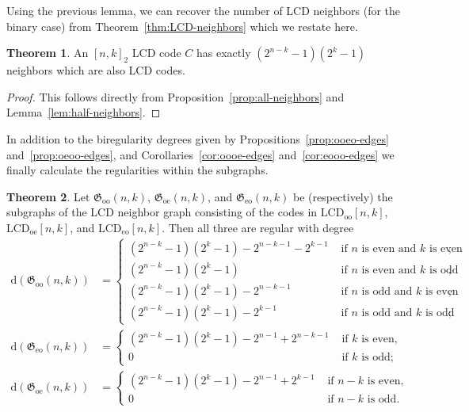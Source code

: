 \documentclass[11pt]{article}
\theoremstyle{definition}
\newtheorem{theorem}{Theorem}[section]
\newcommand{\Gd}[1]{\mathrm{d} \left(#1\right)}                        %
\newcommand{\LCDoo}[2]{\mathrm{LCD}_{\mathrm{oo}} [#1, #2]}
\newcommand{\LCDoe}[2]{\mathrm{LCD}_{\mathrm{oe}} [#1, #2]}
\newcommand{\LCDeo}[2]{\mathrm{LCD}_{\mathrm{eo}} [#1, #2]}
\newcommand{\Gq}{\mathfrak{G}}
\newcommand{\Goo}[2]{\Gq_{\mathrm{oo}} (#1, #2)}
\newcommand{\Goe}[2]{\Gq_{\mathrm{oe}} (#1, #2)}
\newcommand{\Geo}[2]{\Gq_{\mathrm{eo}} (#1, #2)}
\begin{document}
Using the previous lemma, we can recover the number of LCD neighbors (for the binary case) from Theorem~\ref{thm:LCD-neighbors} which we restate here.

\begin{theorem}
	An ${[n, k]}_2$ LCD code $C$ has exactly $(2^{n - k} - 1)(2^k - 1)$ neighbors which are also LCD codes.
\end{theorem}

\begin{proof}
	This follows directly from Proposition~\ref{prop:all-neighbors} and Lemma~\ref{lem:half-neighbors}.
\end{proof}

In addition to the biregularity degrees given by Propositions~\ref{prop:ooeo-edges} and~\ref{prop:oeoo-edges}, and Corollaries~\ref{cor:oooe-edges} and~\ref{cor:eooo-edges} we finally calculate the regularities within the subgraphs.

\begin{theorem}\label{thm:q2Subgraphsregularity}
	Let $\Goo{n}{k}$, $\Goe{n}{k}$, and $\Geo{n}{k}$ be (respectively) the subgraphs of the LCD neighbor graph consisting of the codes in $\LCDoo{n}{k}$, $\LCDoe{n}{k}$, and $\LCDeo{n}{k}$.
	Then all three are regular with degree
	\begin{align*}
		\Gd{\Goo{n}{k}} &= \begin{cases}
			(2^{n - k} - 1)(2^k - 1) - 2^{n - k - 1} - 2^{k - 1}
			&\text{ if $n$ is even and $k$ is even}, \\
			(2^{n - k} - 1)(2^k - 1)
			&\text{ if $n$ is even and $k$ is odd}, \\
			(2^{n - k} - 1)(2^k - 1) - 2^{n - k - 1}
			&\text{ if $n$ is odd and $k$ is even}, \\
			(2^{n - k} - 1)(2^k - 1) - 2^{k - 1}
			&\text{ if $n$ is odd and $k$ is odd};
		\end{cases} \\
		\Gd{\Geo{n}{k}} &= \begin{cases}
			(2^{n - k} - 1)(2^k - 1) - 2^{n - 1} + 2^{n - k - 1}
			&\text{ if $k$ is even}, \\
			0
			&\text{ if $k$ is odd};
		\end{cases} \\
		\Gd{\Goe{n}{k}} &= \begin{cases}
			(2^{n - k} - 1)(2^k - 1) - 2^{n - 1} + 2^{k - 1}
			&\text{ if $n - k$ is even}, \\
			0
			&\text{ if $n - k$ is odd}.
		\end{cases}
	\end{align*}
\end{theorem}
\end{document}
